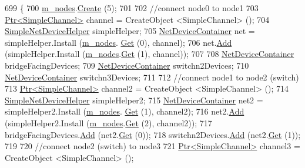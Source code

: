 \begin{DoxyCode}
699 \{
700   \hyperlink{classTwoBridgeTest_af72518a9099a0db24ee51af9bc783c01}{m\_nodes}.\hyperlink{classns3_1_1NodeContainer_a787f059e2813e8b951cc6914d11dfe69}{Create} (5);
701 
702   \textcolor{comment}{//connect node0 to node1}
703   \hyperlink{classns3_1_1Ptr}{Ptr<SimpleChannel>} channel = CreateObject <SimpleChannel> ();
704   \hyperlink{classns3_1_1SimpleNetDeviceHelper}{SimpleNetDeviceHelper} simpleHelper;
705   \hyperlink{classns3_1_1NetDeviceContainer}{NetDeviceContainer} net = simpleHelper.Install (\hyperlink{classTwoBridgeTest_af72518a9099a0db24ee51af9bc783c01}{m\_nodes}.
      \hyperlink{classns3_1_1NodeContainer_a9ed96e2ecc22e0f5a3d4842eb9bf90bf}{Get} (0), channel);
706   net.\hyperlink{classns3_1_1NetDeviceContainer_a7ca8bc1d7ec00fd4fcc63869987fbda5}{Add} (simpleHelper.Install (\hyperlink{classTwoBridgeTest_af72518a9099a0db24ee51af9bc783c01}{m\_nodes}.\hyperlink{classns3_1_1NodeContainer_a9ed96e2ecc22e0f5a3d4842eb9bf90bf}{Get} (1), channel));
707 
708   \hyperlink{classns3_1_1NetDeviceContainer}{NetDeviceContainer} bridgeFacingDevices;
709   \hyperlink{classns3_1_1NetDeviceContainer}{NetDeviceContainer} switchn2Devices;
710   \hyperlink{classns3_1_1NetDeviceContainer}{NetDeviceContainer} switchn3Devices;
711 
712   \textcolor{comment}{//connect node1 to node2 (switch)}
713   \hyperlink{classns3_1_1Ptr}{Ptr<SimpleChannel>} channel2 = CreateObject <SimpleChannel> ();
714   \hyperlink{classns3_1_1SimpleNetDeviceHelper}{SimpleNetDeviceHelper} simpleHelper2;
715   \hyperlink{classns3_1_1NetDeviceContainer}{NetDeviceContainer} net2 = simpleHelper2.Install (\hyperlink{classTwoBridgeTest_af72518a9099a0db24ee51af9bc783c01}{m\_nodes}.
      \hyperlink{classns3_1_1NodeContainer_a9ed96e2ecc22e0f5a3d4842eb9bf90bf}{Get} (1), channel2);
716   net2.\hyperlink{classns3_1_1NetDeviceContainer_a7ca8bc1d7ec00fd4fcc63869987fbda5}{Add} (simpleHelper2.Install (\hyperlink{classTwoBridgeTest_af72518a9099a0db24ee51af9bc783c01}{m\_nodes}.\hyperlink{classns3_1_1NodeContainer_a9ed96e2ecc22e0f5a3d4842eb9bf90bf}{Get} (2), channel2));
717   bridgeFacingDevices.\hyperlink{classns3_1_1NetDeviceContainer_a7ca8bc1d7ec00fd4fcc63869987fbda5}{Add} (net2.\hyperlink{classns3_1_1NetDeviceContainer_a677d62594b5c9d2dea155cc5045f4d0b}{Get} (0));
718   switchn2Devices.\hyperlink{classns3_1_1NetDeviceContainer_a7ca8bc1d7ec00fd4fcc63869987fbda5}{Add} (net2.\hyperlink{classns3_1_1NetDeviceContainer_a677d62594b5c9d2dea155cc5045f4d0b}{Get} (1));
719 
720   \textcolor{comment}{//connect node2 (switch) to node3}
721   \hyperlink{classns3_1_1Ptr}{Ptr<SimpleChannel>} channel3 = CreateObject <SimpleChannel> ();

\end{DoxyCode}

